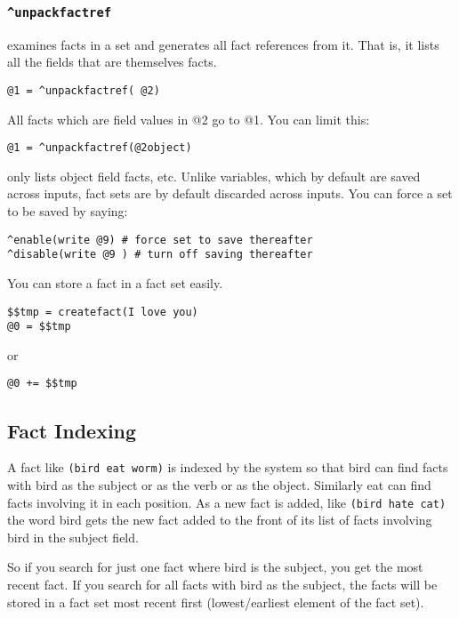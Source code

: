 \documentclass[]{article}
\begin{document}
\subsubsection{\texorpdfstring{\texttt{\^{}unpackfactref}}{\^{}unpackfactref}}\label{unpackfactref}

examines facts in a set and generates all fact references from it. That
is, it lists all the fields that are themselves facts.

\begin{verbatim}
@1 = ^unpackfactref( @2)
\end{verbatim}

All facts which are field values in @2 go to @1. You can limit this:

\begin{verbatim}
@1 = ^unpackfactref(@2object)
\end{verbatim}

only lists object field facts, etc. Unlike variables, which by default
are saved across inputs, fact sets are by default discarded across
inputs. You can force a set to be saved by saying:

\begin{verbatim}
^enable(write @9) # force set to save thereafter
^disable(write @9 ) # turn off saving thereafter
\end{verbatim}

You can store a fact in a fact set easily.

\begin{verbatim}
$$tmp = createfact(I love you)
@0 = $$tmp
\end{verbatim}

or

\begin{verbatim}
@0 += $$tmp
\end{verbatim}

\subsection{Fact Indexing}\label{fact-indexing}

A fact like \texttt{(bird\ eat\ worm)} is indexed by the system so that
bird can find facts with bird as the subject or as the verb or as the
object. Similarly eat can find facts involving it in each position. As a
new fact is added, like \texttt{(bird\ hate\ cat)} the word bird gets
the new fact added to the front of its list of facts involving bird in
the subject field.

So if you search for just one fact where bird is the subject, you get
the most recent fact. If you search for all facts with bird as the
subject, the facts will be stored in a fact set most recent first
(lowest/earliest element of the fact set).
\end{document}
